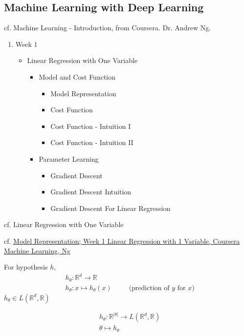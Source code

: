 \documentclass[10pt]{amsart}
\begin{document}
\begin{multicols*}{2}
\part{Machine Learning with Deep Learning}

cf. Machine Learning - Introduction, from Coursera.  Dr. Andrew Ng.

\begin{enumerate}
\item Week 1
  \begin{itemize}
  \item Linear Regression with One Variable
    \begin{itemize}
    \item Model and Cost Function
      \begin{itemize}
      \item Model Representation
      \item Cost Function
      \item Cost Function - Intuition I
      \item Cost Function - Intuition II
      \end{itemize}
    \item Parameter Learning
      \begin{itemize}
      \item Gradient Descent
      \item Gradient Descent Intuition
        \item Gradient Descent For Linear Regression
        \end{itemize}
      \end{itemize}
    \end{itemize}
  \end{enumerate}
cf. Linear Regression with One Variable

cf. \href{https://www.coursera.org/learn/machine-learning/lecture/db3jS/model-representation}{Model Representation; Week 1 Linear Regression with 1 Variable, Coursera Machine Learning, Ng}

For hypothesis $h$,
\[
\begin{aligned}
  & h_{\theta} : \mathbb{R}^d \to \mathbb{R} \\ 
  & h_{\theta} : x \mapsto   h_{\theta}(x)  \qquad \, \text{ (prediction of $y$ for $x$)}
  \end{aligned}
\]
$h_{\theta} \in L(\mathbb{R}^d, \mathbb{R})$

\[
\begin{aligned}
  & h_{\theta} : \mathbb{R}^{ | \theta | } \to L(\mathbb{R}^d , \mathbb{R})  \\ 
  &  \theta \mapsto h_{\theta}
  \end{aligned}
\]


\end{multicols*}
\end{document}
